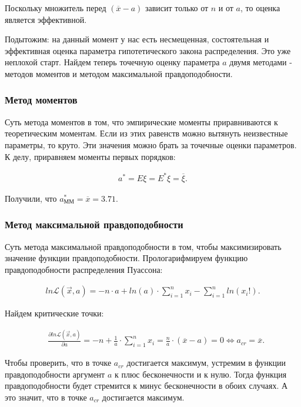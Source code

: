 \documentclass[14pt,a4paper]{scrartcl}
\theoremstyle{definition}
\theoremstyle{remark}
\theoremstyle{definition}
\theoremstyle{definition}
\begin{document}
Поскольку множитель перед $(\overline{x} - a)$ зависит только от $n$ и от $a$, то оценка является эффективной.

Подытожим: на данный момент у нас есть несмещенная, состоятельная и эффективная оценка параметра гипотетического закона распределения. Это уже неплохой старт. Найдем теперь точечную оценку параметра $a$ двумя методами - методов моментов и методом максимальной правдоподобности.

\subsubsection{Метод моментов}

Суть метода моментов в том, что эмпирические моменты приравниваются к теоретическим моментам. Если из этих равенств можно вытянуть неизвестные параметры, то круто. Эти значения можно брать за точечные оценки параметров. К делу, приравняем моменты первых порядков:

\begin{align*}
  a^{*} = E\xi = E^{*}\xi = \overline{\xi}.
\end{align*}

Получили, что $a_{\text{ММ}}^{*} = \overline{x} = 3.71.$

\subsubsection{Метод максимальной правдоподобности}

Суть метода максимальной правдоподобности в том, чтобы максимизировать значение функции правдоподобности. Прологарифмируем функцию правдоподобности распределения Пуассона:

\begin{align*}
  ln \mathcal{L}(\vec{x}, a) = -n\cdot a + ln(a)\cdot \sum_{i = 1}^{n} x_i - \sum_{i = 1}^{n} ln(x_i!).
\end{align*}

Найдем критические точки:

\begin{align*}
  &\frac{\partial ln \mathcal{L}(\vec{x}, a)}{\partial a} = -n + \frac{1}{a}\cdot \sum_{i = 1}^{n} x_i = \frac{n}{a}\cdot (\overline{x} - a) = 0 \iff a_{cr} = \overline{x}.
\end{align*}

Чтобы проверить, что в точке $a_{cr}$ достигается максимум, устремим в функции правдоподобности аргумент $a$ к плюс бесконечности и к нулю. Тогда функция правдоподобности будет стремится к минус бесконечности в обоих случаях. А это значит, что в точке $a_{cr}$ достигается максимум.
\end{document}
